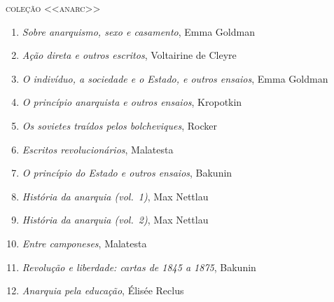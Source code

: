 \medskip
{\large\textsc{coleção <<anarc>>}}

\begin{enumerate}
\setlength\parskip{4.2pt}
\setlength\itemsep{-1.4mm}
\item \textit{Sobre anarquismo, sexo e casamento}, Emma Goldman
\item \textit{Ação direta e outros escritos}, Voltairine de Cleyre
\item \textit{O indivíduo, a sociedade e o Estado, e outros ensaios}, Emma Goldman
\item \textit{O princípio anarquista e outros ensaios}, Kropotkin
\item \textit{Os sovietes traídos pelos bolcheviques}, Rocker
\item \textit{Escritos revolucionários}, Malatesta
\item \textit{O princípio do Estado e outros ensaios}, Bakunin
\item \textit{História da anarquia (vol.~1)}, Max Nettlau
\item \textit{História da anarquia (vol.~2)}, Max Nettlau
\item \textit{Entre camponeses}, Malatesta
\item \textit{Revolução e liberdade: cartas de 1845 a 1875}, Bakunin
\item \textit{Anarquia pela educação}, Élisée Reclus 
\end{enumerate}

\pagebreak